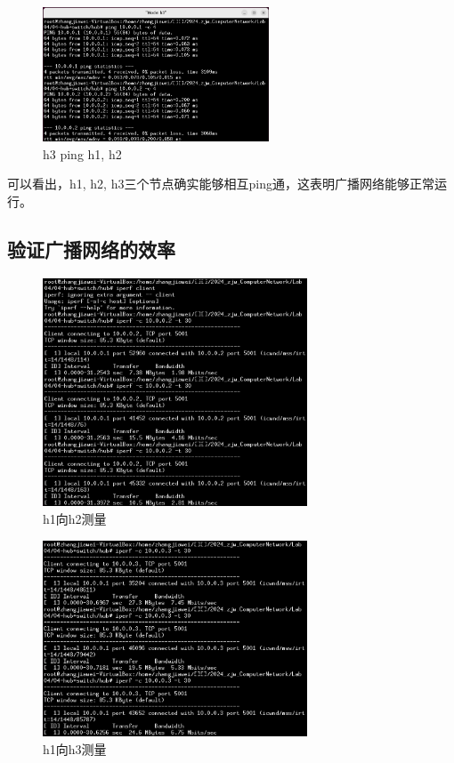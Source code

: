 \documentclass[UTF8]{report}
\begin{document}
\begin{figure}[H]
    \centering
    \includegraphics[width=0.6\textwidth]{h3ping.png}
    \caption{h3 ping h1, h2}
\end{figure}

可以看出，h1, h2, h3三个节点确实能够相互ping通，这表明广播网络能够正常运行。

\subsection{验证广播网络的效率}

\begin{figure}[H]
    \centering
    \includegraphics[width=0.7\textwidth]{h1toh2.png}
    \caption{h1向h2测量}
\end{figure}

\begin{figure}[H]
    \centering
    \includegraphics[width=0.7\textwidth]{h1toh3.png}
    \caption{h1向h3测量}
\end{figure}
\end{document}

